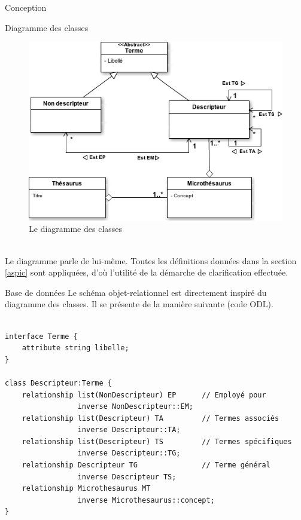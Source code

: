\documentclass[a4paper, 12pt]{report}
\begin{document}
\begin{chapter}{Conception}
\label{tournevis}
	\begin{section}{Diagramme des classes}
		\begin{figure}[h]
			\label{classeur}
			\begin{center}
				\includegraphics[width=13cm]{Classes.png}
				\caption{Le diagramme des classes}
			\end{center}
		\end{figure}~\\
		
		Le diagramme parle de lui-même. Toutes les définitions données dans la section \ref{aspic} sont appliquées, d'où l'utilité de la démarche de clarification effectuée.\\
	\end{section}
\newpage
	\begin{section}{Base de données}
	Le schéma objet-relationnel est directement inspiré du diagramme des classes. Il se présente de la manière suivante (code ODL).\\~\\
	\begin{verbatim}
interface Terme {
	attribute string libelle;
}

class Descripteur:Terme {
	relationship list(NonDescripteur) EP      // Employé pour
	             inverse NonDescripteur::EM;
	relationship list(Descripteur) TA         // Termes associés
	             inverse Descripteur::TA;
	relationship list(Descripteur) TS         // Termes spécifiques
	             inverse Descripteur::TG;
	relationship Descripteur TG               // Terme général
	             inverse Descripteur TS;
	relationship Microthesaurus MT
	             inverse Microthesaurus::concept;
}


\end{verbatim}
\end{section}
\end{chapter}
\end{document}
